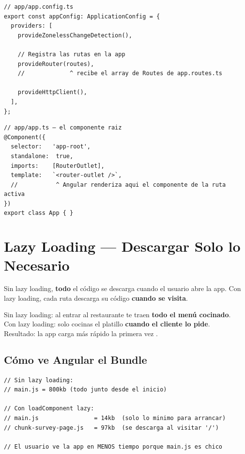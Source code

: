 \documentclass[12pt, a4paper]{article}
\begin{document}
\begin{lstlisting}
// app/app.config.ts
export const appConfig: ApplicationConfig = {
  providers: [
    provideZonelessChangeDetection(),

    // Registra las rutas en la app
    provideRouter(routes),
    //             ^ recibe el array de Routes de app.routes.ts

    provideHttpClient(),
  ],
};
\end{lstlisting}

\begin{lstlisting}
// app/app.ts — el componente raiz
@Component({
  selector:   'app-root',
  standalone:  true,
  imports:    [RouterOutlet],
  template:   `<router-outlet />`,
  //           ^ Angular renderiza aqui el componente de la ruta activa
})
export class App { }
\end{lstlisting}

\section{  Lazy Loading --- Descargar Solo lo Necesario}

Sin lazy loading, \textbf{todo} el código se descarga cuando el usuario abre la app.
Con lazy loading, cada ruta descarga su código \textbf{cuando se visita}.

\begin{tcolorbox}[analogia, title={\emoji{fork-and-knife-with-plate} \emoji{fork-and-knife} El Restaurante con Menú Modular}]
  Sin lazy loading: al entrar al restaurante te traen \textbf{todo el menú cocinado}.\\
  Con lazy loading: solo cocinas el platillo \textbf{cuando el cliente lo pide}.\\[0.3cm]
  Resultado: la app carga más rápido la primera vez .
\end{tcolorbox}

\subsection{ Cómo ve Angular el Bundle}

\begin{lstlisting}
// Sin lazy loading:
// main.js = 800kb (todo junto desde el inicio)

// Con loadComponent lazy:
// main.js                = 14kb  (solo lo minimo para arrancar)
// chunk-survey-page.js   = 97kb  (se descarga al visitar '/')

// El usuario ve la app en MENOS tiempo porque main.js es chico
\end{lstlisting}
\end{document}
